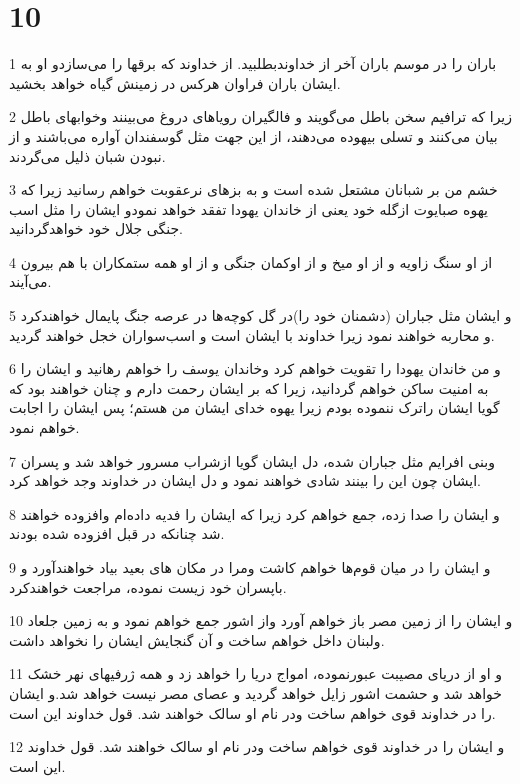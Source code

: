 \chapter{10}

\par 1 باران را در موسم باران آخر از خداوندبطلبید. از خداوند که برقها را می‌سازدو او به ایشان باران فراوان هرکس در زمینش گیاه خواهد بخشید.
\par 2 زیرا که ترافیم سخن باطل می‌گویند و فالگیران رویاهای دروغ می‌بینند وخوابهای باطل بیان می‌کنند و تسلی بیهوده می‌دهند، از این جهت مثل گوسفندان آواره می‌باشند و از نبودن شبان ذلیل می‌گردند.
\par 3 خشم من بر شبانان مشتعل شده است و به بزهای نرعقوبت خواهم رسانید زیرا که یهوه صبایوت ازگله خود یعنی از خاندان یهودا تفقد خواهد نمودو ایشان را مثل اسب جنگی جلال خود خواهدگردانید.
\par 4 از او سنگ زاویه و از او میخ و از اوکمان جنگی و از او همه ستمکاران با هم بیرون می‌آیند.
\par 5 و ایشان مثل جباران (دشمنان خود را)در گل کوچه‌ها در عرصه جنگ پایمال خواهندکرد و محاربه خواهند نمود زیرا خداوند با ایشان است و اسب‌سواران خجل خواهند گردید.
\par 6 و من خاندان یهودا را تقویت خواهم کرد وخاندان یوسف را خواهم رهانید و ایشان را به امنیت ساکن خواهم گردانید، زیرا که بر ایشان رحمت دارم و چنان خواهند بود که گویا ایشان راترک ننموده بودم زیرا یهوه خدای ایشان من هستم؛ پس ایشان را اجابت خواهم نمود.
\par 7 وبنی افرایم مثل جباران شده، دل ایشان گویا ازشراب مسرور خواهد شد و پسران ایشان چون این را بینند شادی خواهند نمود و دل ایشان در خداوند وجد خواهد کرد.
\par 8 و ایشان را صدا زده، جمع خواهم کرد زیرا که ایشان را فدیه داده‌ام وافزوده خواهند شد چنانکه در قبل افزوده شده بودند.
\par 9 و ایشان را در میان قوم‌ها خواهم کاشت ومرا در مکان های بعید بیاد خواهند‌آورد و باپسران خود زیست نموده، مراجعت خواهندکرد.
\par 10 و ایشان را از زمین مصر باز خواهم آورد واز اشور جمع خواهم نمود و به زمین جلعاد ولبنان داخل خواهم ساخت و آن گنجایش ایشان را نخواهد داشت.
\par 11 و او از دریای مصیبت عبورنموده، امواج دریا را خواهد زد و همه ژرفیهای نهر خشک خواهد شد و حشمت اشور زایل خواهد گردید و عصای مصر نیست خواهد شد.و ایشان را در خداوند قوی خواهم ساخت ودر نام او سالک خواهند شد. قول خداوند این است.
\par 12 و ایشان را در خداوند قوی خواهم ساخت ودر نام او سالک خواهند شد. قول خداوند این است.

